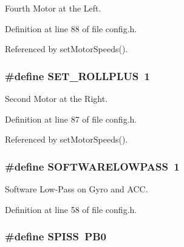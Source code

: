Fourth Motor at the Left. 



Definition at line 88 of file config.\-h.



Referenced by set\-Motor\-Speeds().

\hypertarget{group__config_ga460dbe0039d252579c5ce8beef7cc709}{
\subsubsection[{S\-E\-T\-\_\-\-R\-O\-L\-L\-P\-L\-U\-S}]{\setlength{\rightskip}{0pt plus 5cm}\#define S\-E\-T\-\_\-\-R\-O\-L\-L\-P\-L\-U\-S~1}}\label{group__config_ga460dbe0039d252579c5ce8beef7cc709}


Second Motor at the Right. 



Definition at line 87 of file config.\-h.



Referenced by set\-Motor\-Speeds().

\hypertarget{group__config_gaba06e7be57726e74f267a1622e7d720e}{
\subsubsection[{S\-O\-F\-T\-W\-A\-R\-E\-L\-O\-W\-P\-A\-S\-S}]{\setlength{\rightskip}{0pt plus 5cm}\#define S\-O\-F\-T\-W\-A\-R\-E\-L\-O\-W\-P\-A\-S\-S~1}}\label{group__config_gaba06e7be57726e74f267a1622e7d720e}


Software Low-\/\-Pass on Gyro and A\-C\-C. 



Definition at line 58 of file config.\-h.

\hypertarget{group__config_gab652052c0495e4b720b52cdcf83f535d}{
\subsubsection[{S\-P\-I\-S\-S}]{\setlength{\rightskip}{0pt plus 5cm}\#define S\-P\-I\-S\-S~P\-B0}}\label{group__config_gab652052c0495e4b720b52cdcf83f535d}



